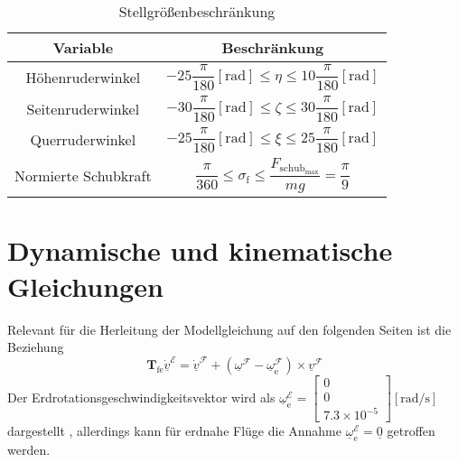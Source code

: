 \begin{table}[h]
\centering
\setlength{\tabcolsep}{12pt} %
\renewcommand{\arraystretch}{1.5} %
 \begin{tabular}{||c c ||} 
 \hline
 Variable & Beschränkung \\ [0.5ex] 
 \hline\hline
  Höhenruderwinkel & $-25\dfrac{\pi}{180}[\mathrm{rad}]\leq\eta\leq 10\dfrac{\pi}{180}[\mathrm{rad}]$\\
  Seitenruderwinkel & $-30 \dfrac{\pi}{180}[\mathrm{rad}]\leq\zeta\leq 30\dfrac{\pi}{180}[\mathrm{rad}]$\\
  Querruderwinkel & $-25 \dfrac{\pi}{180}[\mathrm{rad}]\leq\xi\leq 25\dfrac{\pi}{180}[\mathrm{rad}]$\\
  Normierte Schubkraft & $\dfrac{\pi}{360}\leq\sigma_\mathrm{f}\leq \dfrac{F_\mathrm{schub_{max}}}{mg} = \dfrac{\pi}{9}$\\ 
\hline
\end{tabular}
\caption{Stellgrößenbeschränkung}
\label{tab:SGF}
\end{table}


\section{Dynamische und kinematische Gleichungen}
\label{sec:Dynamik}
Relevant für die Herleitung der Modellgleichung auf den folgenden Seiten ist die Beziehung\\
\begin{equation}
\label{fun:Tfe}
\textbf{T}_\mathrm{fe}\underline{\dot{v}}^\mathcal{E} = \underline{\dot{v}}^\mathcal{F} + (\underline{\omega}^\mathcal{F}-\underline{\omega}^\mathcal{F}_\mathrm{e})\times\underline{v}^\mathcal{F}
\end{equation}
Der Erdrotationsgeschwindigkeitsvektor wird als $\underline{\omega}^\mathcal{E}_\mathrm{e} = \begin{bmatrix} 
0 \\ 0 \\ 7.3\times 10^{-5} 
\end{bmatrix}\mathrm{[rad/s]}$ dargestellt \cite{FlugmechanikBuch}, allerdings kann für erdnahe Flüge die Annahme $\underline{\omega}^\mathcal{E}_\mathrm{e} = \underline{0}$ getroffen werden.
